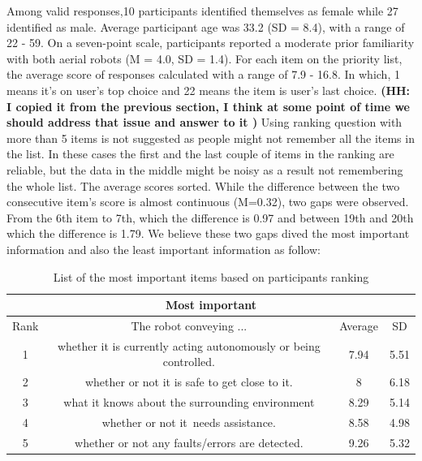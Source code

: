 \documentclass[letterpaper, 10 pt, conference]{ieeeconf}  %
\begin{document}
    Among valid responses,10 participants identified themselves as female while 27 identified as male. Average participant age was 33.2 (SD = 8.4), with a range of 22 - 59. On a seven-point scale, participants reported a moderate prior familiarity with both aerial robots (M = 4.0, SD = 1.4). For each item on the priority list, the average score of responses calculated with a range of 7.9 - 16.8. In which, 1 means it's on user's top choice and 22 means the item is user's last choice. \textbf{(HH: I copied it from the previous section, I think at some point of time we should address that issue and answer to it )} Using ranking question with more than 5 items is not suggested as people might not remember all the items in the list. In these cases the first and the last couple of items in the ranking are reliable, but the data in the middle might be noisy as a result not remembering the whole list. The average scores sorted. While the difference between the two consecutive item's score is almost continuous (M=0.32), two gaps were observed. From the 6th item to 7th, which the difference is 0.97 and between 19th and 20th which the difference is 1.79. We believe these two gaps dived the most important information and also the least important information as follow:

\begin {table}[H]
\begin{center}
\label{table:mostImp}
\begin{tabular}{| c | c | c | c |}
 \hline
 \multicolumn{4}{|c|}{Most important} \\
 \hline
 Rank & The robot conveying ... & Average & SD \\
 \hline
 1 & whether it is currently acting autonomously or being controlled. & 7.94 & 5.51 \\
 \hline
 2 & whether or not it is safe to get close to it. & 8 & 6.18 \\
 \hline
 3 & what it knows about the surrounding environment & 8.29 & 5.14 \\
 \hline
4 & whether or not it needs assistance. & 8.58 & 4.98 \\
 \hline
5 & whether or not any faults/errors are detected. & 9.26 & 5.32 \\
\hline
\end{tabular}
\caption{List of the most important items based on participants ranking}
\end{center}
\end{table}
\end{document}
